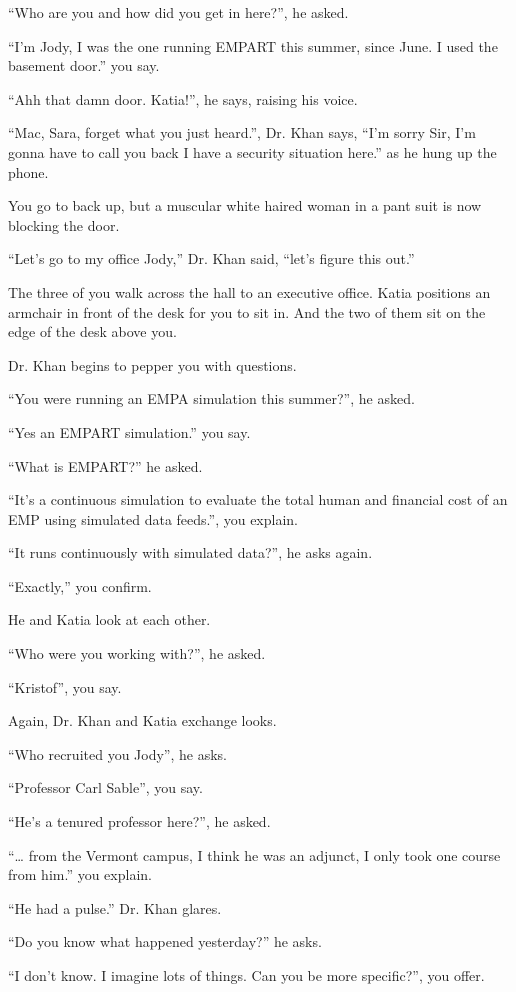 \documentclass[17pt, twoside, a5paper, openright, extrafontsizes]{memoir}
\begin{document}
``Who are you and how did you get in here?'', he asked.

``I'm Jody, I was the one running EMPART this summer, since June. I used
the basement door.'' you say.

``Ahh that damn door. Katia!'', he says, raising his voice.

``Mac, Sara, forget what you just heard.'', Dr. Khan says, ``I'm sorry
Sir, I'm gonna have to call you back I have a security situation here.''
as he hung up the phone.

You go to back up, but a muscular white haired woman in a pant suit is
now blocking the door.

``Let's go to my office Jody,'' Dr. Khan said, ``let's figure this
out.''

The three of you walk across the hall to an executive office. Katia
positions an armchair in front of the desk for you to sit in. And the
two of them sit on the edge of the desk above you.

Dr. Khan begins to pepper you with questions.

``You were running an EMPA simulation this summer?'', he asked.

``Yes an EMPART simulation.'' you say.

``What is EMPART?'' he asked.

``It's a continuous simulation to evaluate the total human and financial
cost of an EMP using simulated data feeds.'', you explain.

``It runs continuously with simulated data?'', he asks again.

``Exactly,'' you confirm.

He and Katia look at each other.

``Who were you working with?'', he asked.

``Kristof'', you say.

Again, Dr. Khan and Katia exchange looks.

``Who recruited you Jody'', he asks.

``Professor Carl Sable'', you say.

``He's a tenured professor here?'', he asked.

``\ldots{} from the Vermont campus, I think he was an adjunct, I only
took one course from him.'' you explain.

``He had a pulse.'' Dr. Khan glares.

``Do you know what happened yesterday?'' he asks.

``I don't know. I imagine lots of things. Can you be more specific?'',
you offer.
\end{document}
